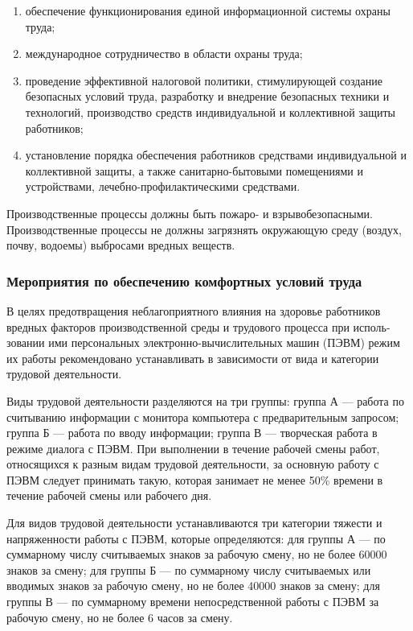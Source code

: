 \begin{enumerate}[1.]
	\item обеспечение функционирования единой информационной системы охраны труда;
	\item международное сотрудничество в области охраны труда;
	\item проведение эффективной налоговой политики, стимулирующей создание безопасных условий труда, разработку и внедрение безопасных техники и технологий, производство средств индивидуальной и коллективной защиты работников;
	\item установление порядка обеспечения работников средствами индивидуальной и коллективной защиты, а также санитарно-бытовыми помещениями и устройствами, лечебно-профилактическими средствами.
\end{enumerate}

Производственные процессы должны быть пожаро- и взрывобезопасными.
Производственные процессы не должны загрязнять окружающую среду (воздух, почву, водоемы) выбросами вредных веществ.

\subsubsection{Мероприятия по обеспечению комфортных условий труда}

В целях предотвращения неблагоприятного влияния на здоровье работников вредных факторов производственной среды и трудового процесса при исполь-зовании ими персональных электронно-вычислительных машин (ПЭВМ) режим их работы рекомендовано устанавливать в зависимости от вида и категории трудовой деятельности.

Виды трудовой деятельности разделяются на три группы: группа А --- работа по считыванию информации с монитора компьютера с предварительным запросом; группа Б --- работа по вводу информации; группа В --- творческая работа в режиме диалога с ПЭВМ. При выполнении в течение рабочей смены работ, относящихся к разным видам трудовой деятельности, за основную работу с ПЭВМ следует принимать такую, которая занимает не менее 50\% времени в течение рабочей смены или рабочего дня.

Для видов трудовой деятельности устанавливаются три категории тяжести и напряженности работы с ПЭВМ, которые определяются: для группы А --- по суммарному числу считываемых знаков за рабочую смену, но не более 60000 знаков за смену; для группы Б --- по суммарному числу считываемых или вводимых знаков за рабочую смену, но не более 40000 знаков за смену; для группы В --- по суммарному времени непосредственной работы с ПЭВМ за рабочую смену, но не более 6 часов за смену.

